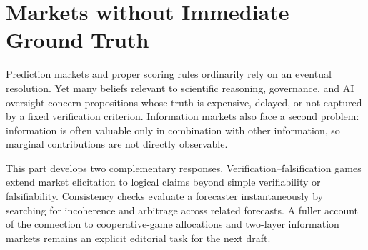\chapter{Markets without Immediate Ground Truth}
\label{chap:subjective-intro}

\begin{drafttext}
Prediction markets and proper scoring rules ordinarily rely on an eventual
resolution. Yet many beliefs relevant to scientific reasoning, governance, and
AI oversight concern propositions whose truth is expensive, delayed, or not
captured by a fixed verification criterion. Information markets also face a
second problem: information is often valuable only in combination with other
information, so marginal contributions are not directly observable.

This part develops two complementary responses. Verification--falsification
games extend market elicitation to logical claims beyond simple verifiability or
falsifiability. Consistency checks evaluate a forecaster instantaneously by
searching for incoherence and arbitrage across related forecasts. A fuller
account of the connection to cooperative-game allocations and two-layer
information markets remains an explicit editorial task for the next draft.
\end{drafttext}
